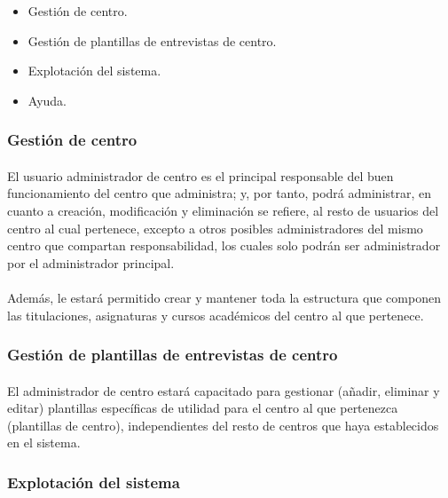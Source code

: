       \begin{itemize}
       \item Gestión de centro.
       \item Gestión de plantillas de entrevistas de centro.
       \item Explotación del sistema.
       \item Ayuda.
      \end{itemize}

      \subsubsection{Gestión de centro}

      \paragraph{}El usuario administrador de centro es el principal responsable
      del buen funcionamiento del centro que administra; y, por tanto, podrá
      administrar, en cuanto a creación, modificación y eliminación se refiere,
      al resto de usuarios del centro al cual pertenece, excepto a otros
      posibles administradores del mismo centro que compartan responsabilidad,
      los cuales solo podrán ser administrador por el administrador principal.

      \paragraph{}Además, le estará permitido crear y mantener toda la
      estructura que componen las titulaciones, asignaturas y cursos
      académicos del centro al que pertenece.

      \subsubsection{Gestión de plantillas de entrevistas de centro}

      \paragraph{}El administrador de centro estará capacitado para gestionar
      (añadir, eliminar y editar) plantillas específicas de utilidad para el
      centro al que pertenezca (plantillas de centro), independientes del resto
      de centros que haya establecidos en el sistema.

      \subsubsection{Explotación del sistema}

